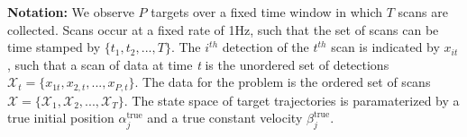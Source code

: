 
{\bf Notation:}
We observe $P$ targets over a fixed time window in which $T$ scans are collected. Scans occur at a fixed rate of 1Hz, such that the set of scans can be time stamped by $\{t_{1}, t_{2},...,T\}. $ The $i^{th}$ detection of the $t^{th}$ scan is indicated by $x_{it}$, such that a scan of data at time \textit{t} is the unordered set of detections $\mathcal{X}_{t} = \{x_{1t}, x_{2,t},...,x_{P,t}\}$. The data for the problem is the ordered set of scans $\boldsymbol{\mathcal{X}}=\{\mathcal{X}_{1},\mathcal{X}_{2},...,\mathcal{X}_{T}\}$. The state space of target trajectories is paramaterized by a true initial position $\alpha^{\text{true}}_{j}$ and a true constant velocity $\beta^{\text{true}}_{j}$. 